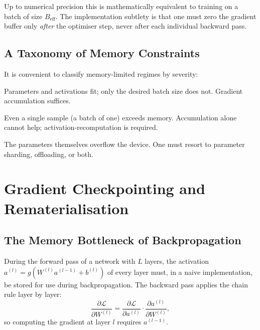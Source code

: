 \documentclass[11pt,a4paper]{article}
\theoremstyle{definition}
\theoremstyle{remark}
\theoremstyle{plain}
\newcommand{\LL}{\mathcal{L}}
\begin{document}
Up to numerical precision this is mathematically equivalent to training
on a batch of size $B_{\mathrm{eff}}$. The implementation subtlety is
that one must zero the gradient buffer only \emph{after} the optimiser
step, never after each individual backward pass.

\subsection{A Taxonomy of Memory Constraints}

It is convenient to classify memory-limited regimes by severity:

\begin{description}[leftmargin=1.5em, style=nextline]
    \item[Easy mode.] Parameters and activations fit; only the desired
    batch size does not. Gradient accumulation suffices.
    \item[Hard mode.] Even a single sample (a batch of one) exceeds
    memory. Accumulation alone cannot help; activation-recomputation is
    required.
    \item[Expert mode.] The parameters themselves overflow the device.
    One must resort to parameter sharding, offloading, or both.
\end{description}

\section{Gradient Checkpointing and Rematerialisation}
\label{sec:ckpt}

\subsection{The Memory Bottleneck of Backpropagation}

During the forward pass of a network with $L$ layers, the activation
$a^{(l)} = g\!\left(W^{(l)} a^{(l-1)} + b^{(l)}\right)$ of every layer
must, in a naive implementation, be stored for use during
backpropagation. The backward pass applies the chain rule layer by layer:
\begin{equation}
\frac{\partial \LL}{\partial W^{(l)}}
    = \frac{\partial \LL}{\partial a^{(l)}} \cdot
      \frac{\partial a^{(l)}}{\partial W^{(l)}},
\end{equation}
so computing the gradient at layer $l$ requires $a^{(l-1)}$.
\end{document}
